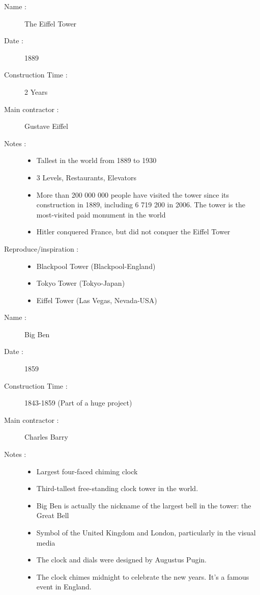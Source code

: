 \documentclass[11pt;a4paper]{report}
\begin{document}
\begin{description}
 \item[Name :]The Eiffel Tower
 \item[Date :] 1889
 \item[Construction Time :]2 Years
 \item[Main contractor :]Gustave Eiffel
 \item[Notes :]

\begin{itemize}
  \item Tallest in the world from 1889 to 1930
  \item 3 Levels, Restaurants, Elevators
  \item More than 200 000 000 people have visited the tower since its construction in 1889, including 6 719 200 in 2006. The tower is the most-visited paid monument in the world
  \item Hitler conquered France, but did not conquer the Eiffel Tower
  \end{itemize}
 \item[Reproduce/inspiration :]


 \begin{itemize}
  \item Blackpool Tower (Blackpool-England)
  \item Tokyo Tower (Tokyo-Japan)
  \item Eiffel Tower (Las Vegas, Nevada-USA)
  \end{itemize}
\end{description}
\begin{description}
 \item[Name :]Big Ben
 \item[Date :]1859
 \item[Construction Time :]1843-1859 (Part of a huge project)
 \item[Main contractor :]Charles Barry
 \item[Notes :]


  \begin{itemize}
  \item Largest four-faced chiming clock
  \item Third-tallest free-standing clock tower in the world.
  \item Big Ben is actually the nickname of the largest bell in the tower: the Great Bell
  \item Symbol of the United Kingdom and London, particularly in the visual media
  \item The clock and dials were designed by Augustus Pugin.
  \item The clock chimes midnight to celebrate the new years. It’s a famous event in England.
  \end{itemize}
\end{description} 
\end{document}
